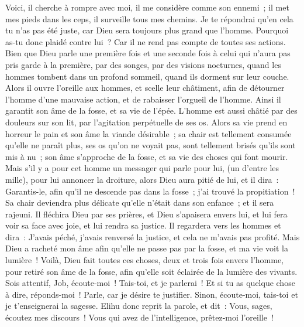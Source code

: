 \begin{multicols}{2}
Voici, il cherche à rompre avec moi, il me considère comme son ennemi~;
il met mes pieds dans les ceps, il surveille tous mes chemins.
Je te répondrai qu'en cela tu n'as pas été juste, car Dieu sera toujours plus grand que l'homme.
Pourquoi as-tu donc plaidé contre lui~? Car il ne rend pas compte de toutes ses actions.
Bien que Dieu parle une première fois et une seconde fois à celui qui n'aura pas pris garde à la première,
par des songes, par des visions nocturnes, quand les hommes tombent dans un profond sommeil, quand ils dorment sur leur couche.
Alors il ouvre l'oreille aux hommes, et scelle leur châtiment,
afin de détourner l'homme d'une mauvaise action, et de rabaisser l'orgueil de l'homme.
Ainsi il garantit son âme de la fosse, et sa vie de l'épée.
L'homme est aussi châtié par des douleurs sur son lit, par l'agitation perpétuelle de ses os.
Alors sa vie prend en horreur le pain et son âme la viande désirable~;
sa chair est tellement consumée qu'elle ne paraît plus, ses os qu'on ne voyait pas, sont tellement brisés qu'ils sont mis à nu~;
son âme s'approche de la fosse, et sa vie des choses qui font mourir.
Mais s'il y a pour cet homme un messager qui parle pour lui, (un d'entre les mille), pour lui annoncer la droiture,
alors Dieu aura pitié de lui, et il dira~: Garantis-le, afin qu'il ne descende pas dans la fosse~; j'ai trouvé la propitiation~!
Sa chair deviendra plus délicate qu'elle n'était dans son enfance~; et il sera rajeuni.
Il fléchira Dieu par ses prières, et Dieu s'apaisera envers lui, et lui fera voir sa face avec joie, et lui rendra sa justice.
Il regardera vers les hommes et dira~: J'avais péché, j'avais renversé la justice, et cela ne m'avais pas profité.
Mais Dieu a racheté mon âme afin qu'elle ne passe pas par la fosse, et ma vie voit la lumière~!
Voilà, Dieu fait toutes ces choses, deux et trois fois envers l'homme,
pour retiré son âme de la fosse, afin qu'elle soit éclairée de la lumière des vivants.
Sois attentif, Job, écoute-moi~! Tais-toi, et je parlerai~!
Et si tu as quelque chose à dire, réponds-moi~! Parle, car je désire te justifier.
Sinon, écoute-moi, tais-toi et je t'enseignerai la sagesse.
\VerseOne{}Elihu donc reprit la parole, et dit~:
Vous, sages, écoutez mes discours~! Vous qui avez de l'intelligence, prêtez-moi l'oreille~!

\end{multicols}

